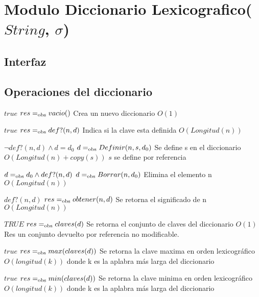 \section{Modulo Diccionario Lexicografico($String$, $\sigma$)}

\subsection{Interfaz}


  \subsection*{Operaciones del diccionario}

 {$true$}
 {$res =_{\mathrm{obs}} vacio()$}
 {Crea un nuevo diccionario}
 {$O(1)$}
 {}

 
  {$true$}
  {$res =_{\mathrm{obs}} def?(n,d)$}
  {Indica si la clave esta definida}
  {$O(Longitud(n))$}
  {}

  {$\neg def?(n,d) \land d=d_0$}
  {$d =_{\mathrm{obs}} Definir(n, s, d_0)$}
  {Se define s en el diccionario}
  {$O(Longitud(n)+copy(s))$}
  {$s$ se define por referencia}

 {$d =_{\mathrm{obs}} d_0 \land def?(n,d)$}
 {$d =_{\mathrm{obs}} Borrar(n,d_0)$}
 {Elimina el elemento n}
 {$O(Longitud(n))$}
 {}

 {$def?(n,d)$}
 {$res =_{\mathrm{obs}} obtener(n,d)$}
 {Se retorna el significado de n}
 {$O(Longitud(n))$}
 {}
 
 {$TRUE$}
 {$res =_{\mathrm{obs}} claves(d)$}
 {Se retorna el conjunto de claves del diccionario}
 {$O(1)$}
 {Res un conjunto devuelto por referencia no modificable. }
 
 {$true$}
 {$res =_{\mathrm{obs}} max(claves(d))$}
 {Se retorna la clave maxima en orden lexicográfico}
 {$O(longitud(k))$ donde k es la aplabra más larga del diccionario}
 {}
 
 {$true$}
 {$res =_{\mathrm{obs}} min(claves(d))$}
 {Se retorna la clave minima en orden lexicográfico}
 {$O(longitud(k))$ donde k es la aplabra más larga del diccionario}
 {}

